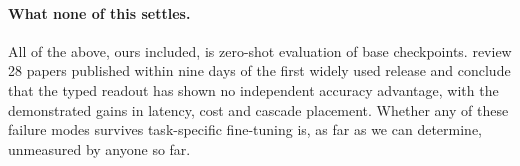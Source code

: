 \documentclass[11pt]{article}
\begin{document}
\paragraph{What none of this settles.} All of the above, ours included, is
zero-shot evaluation of base checkpoints. \citet{tang2026audit} review 28 papers
published within nine days of the first widely used release and conclude that
the typed readout has shown no independent accuracy advantage, with the
demonstrated gains in latency, cost and cascade placement. Whether any of these
failure modes survives task-specific fine-tuning is, as far as we can determine,
unmeasured by anyone so far.


\end{document}
